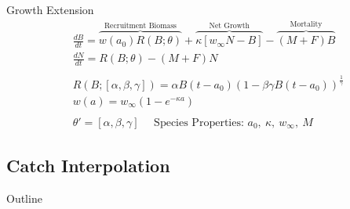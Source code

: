 \documentclass[ xcolor = pdftex, dvipsnames, table ]{beamer}
\begin{document}
%
\begin{frame}{Growth Extension}
\begin{align*}%
&\frac{dB}{dt} = \overbrace{w(a_0)R(B;\theta)}^\text{Recruitment Biomass} + \overbrace{\kappa \left[w_\infty N-B\right]}^\text{Net Growth} - \overbrace{(M+F)B}^\text{Mortality} \\%
&\frac{dN}{dt} = R(B;\theta) - (M+F)N \\%
&~\\
&R(B;[\alpha, \beta, \gamma]) = \alpha B(t-a_0)(1-\beta\gamma B(t-a_0))^{\frac{1}{\gamma}} \\%
&w(a) = w_\infty(1-e^{-\kappa a})\\ %
&~\\
&\theta' = [\alpha, \beta, \gamma] ~~~ ~~~ \text{Species Properties: } a_0,~\kappa,~w_\infty,~M
\end{align*}
\end{frame}

%
\subsection{Catch Interpolation}
\begin{frame}{Outline}
\end{frame}
%
\end{document}
